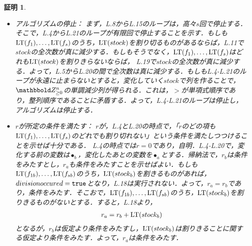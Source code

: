 \documentclass[9pt]{ltjsarticle}
\theoremstyle{break}
\theoremstyle{break}
\theoremstyle{break}
\theoremstyle{break}
\theoremstyle{break}
\theoremstyle{break}
\theoremstyle{break}
\theoremstyle{break}
\theoremstyle{break}
\theoremstyle{break}
\theoremstyle{break}
\theoremstyle{break}
\theoremstyle{break}
\theoremstyle{break}
\theoremstyle{break}
\theoremstyle{nonumberbreak}
\newtheorem{myproof}{証明}
\theoremstyle{nonumberbreak}
\begin{document}
\begin{myproof}
\begin{itemize}
\begin{itemize}
となる．たしかに，
\begin{align}
 a_{1a}f_1 + \dots + a_{sa}f_s + stock_a + r_a
&=
\sum_{j=1}^s a_{jb}  f_j + \frac{\LT(stock_b)}{\LT(f_i)}f_i + stock_b - \frac{\LT(stock_b)}{\LT(f_i)}f_i + r_b\\
 & =
a_{1b}f_1 + \dots + a_{sb}f_s + stock_b + r_b.
\end{align}
 \item $\LT(f_1),\dots,\LT(f_s)$のうちで，$\LT(stock_b)$を割り切るものがないとき：L9-L.13は実行されず，L.17-L.20だけが実行される．
このとき，
\begin{align}
 a_{ja} &= a_{jb}\\
 stock_a & = stock_b - \LT(stock_b)\\
 r_a & = r_b + \LT(stock_b)
\end{align}
となる．そして，
\begin{align}
 a_{1a} f_{1a} + \dots + a_{sa} f_{sa} + stock_a + r_a
&=
a_{1b} f_{1b} + \dots + a_{sb} f_{sb} + stock_b - \LT(stock_b) + r_b + \LT(stock_b)\\
 & =
a_{1b}f_{1b} + \dots + a_{sb} f_{sb} + stock_b + r_b.
\end{align}
どちらにせよ，
$a_1 f_1 + \dots + a_s f_s + stock + r$は実行中保たれることになる．
\end{itemize}
  \item アルゴリズムの停止：
まず，L.8からL.15のループは，高々$s$回で停止する．そこで，L.4からL.21のループが有限回で停止することを示す．もしも$\LT(f_1),\dots,\LT(f_s)$のうち，${\rm LT}(stock)$を割り切るものがあるならば，L.11で$stock$の全次数が真に減少する．もしもそうでなく，$\LT(f_1),\dots,\LT(f_s)$はどれも${\rm LT}(stock)$を割りきらないならば，
L.19で$stock$の全次数が真に減少する．よって，L.5からL.20の間で全次数は真に減少する．もしもL.4-L.21のループが永遠に止まらないとすると，変化していく$stock$で列を作ることで，$\Zge^n$の単調減少列が得られる．これは，$>$が単項式順序であり，整列順序であることに矛盾する．よって，L.4-L.21のループは停止し，アルゴリズムは停止する．
  \item $r$が所定の条件を満たす：
$r$が，L.4とL.20の時点で，「$r$のどの項も$\LT(f_1),\dots,\LT(f_s)$のどれでも割り切れない」という条件を満たしつつけることを示せば十分である．
L.4の時点では$r=0$であり，自明．L.4-L.20で，変化する前の変数は$\bullet_b$，変化したあとの変数を$\bullet_a$とする．帰納法で，$r_b$は条件をみたすとし，$r_a$も条件をみたすことを示せばよい．もしも${\rm LT}(f_{1b}),\dots,{\rm LT}(f_{sb})$のうち，$\LT(stock_b)$を割きるものがあれば，$divisionoccured = {\tt true}$となり，L.18は実行されない．よって，$r_a = r_b$であり，条件をみたす．そこおで，${\rm LT}(f_{1b}),\dots,{\rm LT}(f_{sb})$のうち，$\LT(stock_b)$を割りきるものがないとする．すると，L.18より，
\begin{align}
 r_a = r_b + {\rm LT}(stock_b)
\end{align}
となるが，$r_b$は仮定より条件をみたすし，$\LT(stock_b)$は割りきることに関する仮定より条件をみたす．よって，$r_a$は条件をみたす．


\end{itemize}
\end{myproof}
\end{document}
